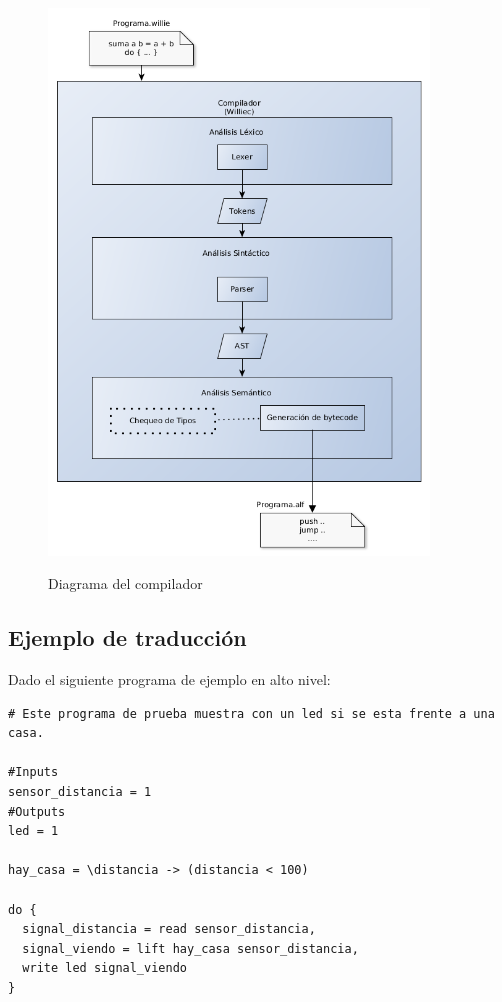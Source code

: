 \begin{figure}[hp]
\begin{center}
\caption{Diagrama del compilador}
\includegraphics[width=0.9\textwidth]{graphs/compiler.png}
\label{fig:compiler}
\end{center}
\end{figure}

\newpage
\subsection{Ejemplo de traducción}

Dado el siguiente programa de ejemplo en alto nivel:

\begin{verbatim}
# Este programa de prueba muestra con un led si se esta frente a una casa.

#Inputs
sensor_distancia = 1
#Outputs
led = 1

hay_casa = \distancia -> (distancia < 100)

do {
  signal_distancia = read sensor_distancia,
  signal_viendo = lift hay_casa sensor_distancia,
  write led signal_viendo
}
\end{verbatim}

